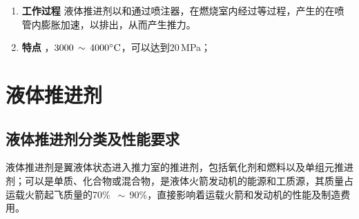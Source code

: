 \begin{enumerate}[\hspace*{1.5em} (1) ]
\begin{figure}[!htb]
\begin{minipage}{0.45\linewidth}
			\label{推力室2}
		\end{minipage}
	\end{figure}
	\vspace*{-1em}
	\item \textbf{工作过程} \hspace*{1em} 液体推进剂以\blue[规定的流量]和\blue[混合比]通过喷注器\blue[喷入燃烧室]，在燃烧室内经过\blue[雾化、蒸发、混合和燃烧]等过程，产生的\blue[高温、高压燃气]在喷管内膨胀加速，以\blue[超声速]排出，从而产生推力。
	\item \textbf{特点} \hspace*{1em} \red[高温、高压环境]，$3000\, \sim \, 4000 {}^{\circ}\text{C}$，可以达到20$\,$MPa；\\
	\hspace*{3.5em}
\end{enumerate}

\sssection[推进剂供应系统]


\section{液体推进剂}
\subsection{液体推进剂分类及性能要求}
液体推进剂是翼液体状态进入推力室的推进剂，包括氧化剂和燃料以及单组元推进剂；可以是单质、化合物或混合物，是液体火箭发动机的能源和工质源，其质量占运载火箭起飞质量的70\% $\, \sim \,$90\%，直接影响着运载火箭和发动机的性能及制造费用。
\vspace*{0.5em}

\sssection[液体推进剂的分类]

